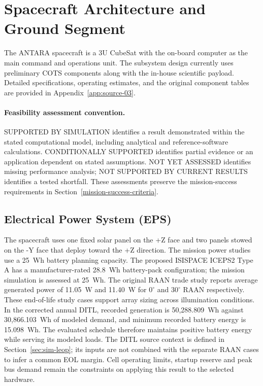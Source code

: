\section{Spacecraft Architecture and Ground Segment}\label{spacecraft-architecture}
The ANTARA spacecraft is a 3U CubeSat with the on-board computer as the main command and operations unit. The subsystem design currently uses preliminary COTS components along with the in-house scientific payload. Detailed specifications, operating estimates, and the original component tables are provided in Appendix~\ref{app:source-03}.

\paragraph{Feasibility assessment convention.} SUPPORTED BY SIMULATION identifies a result demonstrated within the stated computational model, including analytical and reference-software calculations. CONDITIONALLY SUPPORTED identifies partial evidence or an application dependent on stated assumptions. NOT YET ASSESSED identifies missing performance analysis; NOT SUPPORTED BY CURRENT RESULTS identifies a tested shortfall. These assessments preserve the mission-success requirements in Section~\ref{mission-success-criteria}.

\subsection{Electrical Power System (EPS)}\label{electrical-power-system-eps}
The spacecraft uses one fixed solar panel on the +Z face and two panels stowed on the -Y face that deploy toward the +Z direction. The mission power studies use a 25~Wh battery planning capacity. The proposed ISISPACE ICEPS2 Type A has a manufacturer-rated 28.8~Wh battery-pack configuration; the mission simulation is assessed at 25~Wh. The original RAAN trade study reports average generated power of 11.05~W and 11.40~W for $0^\circ$ and $30^\circ$ RAAN respectively. These end-of-life study cases support array sizing across illumination conditions. In the corrected annual DITL, recorded generation is 50,288.809~Wh against 30,866.103~Wh of modeled demand, and minimum recorded battery energy is 15.098~Wh. The evaluated schedule therefore maintains positive battery energy while serving its modeled loads. The DITL source context is defined in Section~\ref{sec:sim-leop}; its inputs are not combined with the separate RAAN cases to infer a common EOL margin. Cell operating limits, startup reserve and peak bus demand remain the constraints on applying this result to the selected hardware.


